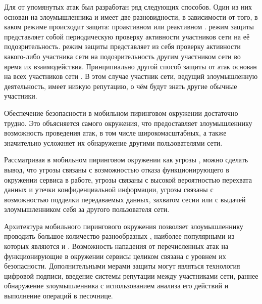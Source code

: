 %
Для  от упомянутых атак был разработан ряд следующих способов. 
%
Один из них основан на  злоумышленника и имеет две разновидности, в зависимости от того, в каком режиме происходит защита: проактивном или реактивном . 
%
 режим защиты представляет собой периодическую проверку активности участников сети на её подозрительность. 
%
 режим защиты представляет из себя проверку активности какого-либо участника сети на подозрительность другим участником сети во время их взаимодействия. 
%
Принципиально другой способ защиты от атак основан на  всех участников сети  .
%
В этом случае участник сети, ведущий злоумышленную деятельность, имеет низкую репутацию, о чём будут знать другие обычные участники. 



%
Обеспечение безопасности в мобильном пиринговом окружении достаточно трудно. 
%
Это объясняется  самого окружения, что предоставляет злоумышленнику возможность проведения атак, в том числе широкомасштабных, а также значительно усложняет их обнаружение другими пользователями сети.

%
Рассматривая  в мобильном пиринговом окружении как угрозы , можно сделать вывод, что угрозы  связаны с возможностью отказа функционирующего в окружении сервиса в работе, угрозы  связаны с высокой вероятностью перехвата данных и утечки конфиденциальной информации, угрозы  связаны с возможностью подделки передаваемых данных, захватом сесии или с выдачей злоумышленником себя за другого пользователя сети. 

%
Архитектура мобильного пирингового окружения позволяет злоумышленнику проводить большое количество разнообразных , наиболее популярными из которых являются  и . 
%
Возможность  нападения от перечисленных атак на функционирующие в окружении сервисы целиком связана с уровнем их безопасности. 
%
Дополнительными мерами защиты могут являться технология цифровой подписи, введение системы репутации между участниками сети, раннее обнаружение злоумышленника с использованием анализа его действий и выполнение операций в песочнице.